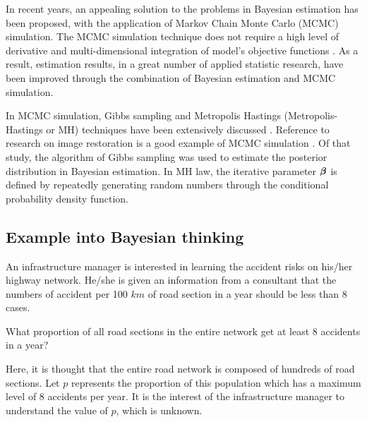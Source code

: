 In recent years, an appealing solution to the problems in Bayesian estimation has been proposed, with the application of Markov Chain Monte Carlo (MCMC) simulation. The MCMC simulation technique does not require a high level of derivative and multi-dimensional integration of model's objective functions \citep{robert}. As a result, estimation results, in a great number of applied statistic research, have been improved through the combination of Bayesian estimation and MCMC simulation.

In MCMC simulation, Gibbs sampling and Metropolis Hastings (Metropolis-Hastings or MH) techniques have been extensively discussed \citep{robert}. Reference to research on image restoration is a good example of MCMC simulation \citep{Geman1984}. Of that study, the algorithm of Gibbs sampling was used to estimate the posterior distribution in Bayesian estimation. In MH law, the iterative parameter $\mbox{\boldmath$\beta$}$ is defined by repeatedly generating random numbers through the conditional probability density function. 


\subsection{Example into Bayesian thinking}\label{bayesianexample1}
An infrastructure manager is interested in learning the accident risks on his/her highway network. He/she is given an information from a consultant that the numbers of accident per 100 $km$ of road section in a year should be less than 8 cases. 

What proportion of all road sections in the entire network get at least 8 accidents in a year?

Here, it is thought that the entire road network is composed of hundreds of road sections. Let $p$ represents the proportion of this population which has a maximum level of 8 accidents per year. It is the interest of the infrastructure manager to understand the value of $p$, which is unknown.

